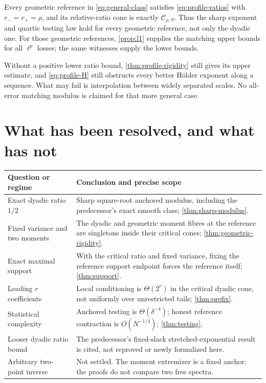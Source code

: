 \documentclass[11pt,a4paper]{article}
\numberwithin{equation}{section}
\theoremstyle{definition}
\theoremstyle{remark}
\newcommand{\C}{\mathcal C}
\begin{document}
Every geometric reference in \eqref{eq:general-class} satisfies
\eqref{eq:profile-ratios} with $r_-=r_+=\rho$, and its relative-ratio
cone is exactly $\C_{\rho,S}$. Thus the sharp exponent and quartic testing
law hold for every geometric reference, not only the dyadic one. For those
geometric references, \cref{prop:l1} supplies the matching upper bounds for
all $\ell^p$ losses; the same witnesses supply the lower bounds.

Without a positive lower ratio bound, \cref{thm:profile-rigidity} still gives
its upper estimate, and \eqref{eq:profile-H} still obstructs every better
H\"older exponent along a sequence. What may fail is interpolation between
widely separated scales. No all-error matching modulus is claimed for that
more general case.

\section{What has been resolved, and what has not}
\label{sec:scope}

\begin{center}\small
\begin{tabular}{@{}>{\raggedright\arraybackslash}p{}
>{\raggedright\arraybackslash}p{}@{}}
\toprule
Question or regime & Conclusion and precise scope\\
\midrule
Exact dyadic ratio $1/2$ & Sharp square-root anchored modulus, including the
predecessor's exact smooth class; \cref{thm:sharp-modulus}.\\[5pt]
Fixed variance and two moments & The dyadic and geometric moment fibres at
the reference are singletons inside their critical cones;
\cref{thm:geometric-rigidity}.\\[5pt]
Exact maximal support & With the critical ratio and fixed variance, fixing
the reference support endpoint forces the reference itself;
\cref{thm:support}.\\[5pt]
Leading $r$ coefficients & Local conditioning is $\Theta(2^r)$ in the
critical dyadic cone, not uniformly over unrestricted tails;
\cref{thm:prefix}.\\[5pt]
Statistical complexity & Anchored testing is $\Theta(\delta^{-4})$; honest
reference contraction is $O(N^{-1/4})$;
\cref{thm:testing}.\\[5pt]
Looser dyadic ratio bound & The predecessor's fixed-slack stretched-exponential
result is cited, not reproved or newly formalized here.\\[5pt]
Arbitrary two-point inverse & Not settled. The moment extremizer is a fixed
anchor; the proofs do not compare two free spectra.\\
\bottomrule
\end{tabular}
\end{center}
\end{document}

